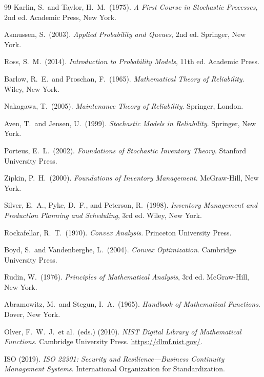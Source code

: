 \documentclass[12pt,a4paper]{article}
\theoremstyle{plain}
\theoremstyle{definition}
\theoremstyle{remark}
\begin{document}
\begin{thebibliography}{99}
Karlin, S.\ and Taylor, H.\ M.\ (1975).
\textit{A First Course in Stochastic Processes},
2nd ed.
Academic Press, New York.

Asmussen, S.\ (2003).
\textit{Applied Probability and Queues},
2nd ed.
Springer, New York.

Ross, S.\ M.\ (2014).
\textit{Introduction to Probability Models},
11th ed.
Academic Press.

Barlow, R.\ E.\ and Proschan, F.\ (1965).
\textit{Mathematical Theory of Reliability}.
Wiley, New York.

Nakagawa, T.\ (2005).
\textit{Maintenance Theory of Reliability}.
Springer, London.

Aven, T.\ and Jensen, U.\ (1999).
\textit{Stochastic Models in Reliability}.
Springer, New York.

Porteus, E.\ L.\ (2002).
\textit{Foundations of Stochastic Inventory Theory}.
Stanford University Press.

Zipkin, P.\ H.\ (2000).
\textit{Foundations of Inventory Management}.
McGraw-Hill, New York.

Silver, E.\ A., Pyke, D.\ F., and Peterson, R.\ (1998).
\textit{Inventory Management and Production Planning and Scheduling},
3rd ed.
Wiley, New York.

Rockafellar, R.\ T.\ (1970).
\textit{Convex Analysis}.
Princeton University Press.

Boyd, S.\ and Vandenberghe, L.\ (2004).
\textit{Convex Optimization}.
Cambridge University Press.

Rudin, W.\ (1976).
\textit{Principles of Mathematical Analysis},
3rd ed.
McGraw-Hill, New York.

Abramowitz, M.\ and Stegun, I.\ A.\ (1965).
\textit{Handbook of Mathematical Functions}.
Dover, New York.

Olver, F.\ W.\ J.\ et al.\ (eds.) (2010).
\textit{NIST Digital Library of Mathematical Functions}.
Cambridge University Press.
\url{https://dlmf.nist.gov/}.

ISO (2019).
\textit{ISO 22301: Security and Resilience---Business Continuity
Management Systems}.
International Organization for Standardization.


\end{thebibliography}
\end{document}
